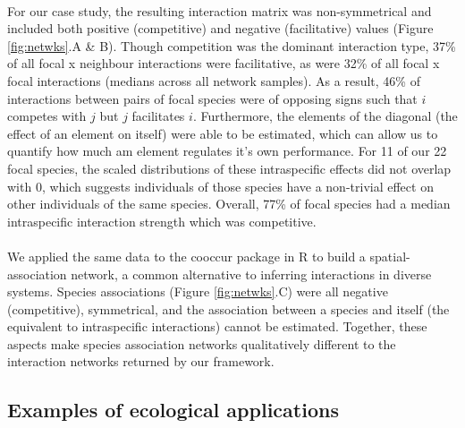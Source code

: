 \documentclass[a4,12pt]{article}
\begin{document}
  


    \paragraph{}
     For our case study, the resulting interaction matrix was non-symmetrical and included both positive (competitive) and negative (facilitative) values (Figure \ref{fig:netwks}.A \& B). Though competition was the dominant interaction type,  37\% of all focal x neighbour interactions were facilitative, as were 32\% of all focal x focal interactions (medians across all network samples). As a result, 46\% of interactions between pairs of focal species were of opposing signs such that $i$ competes with $j$ but $j$ facilitates $i$. Furthermore, the elements of the diagonal (the effect of an element on itself) were able to be estimated, which can allow us to quantify how much am element regulates it's own performance. For 11 of our 22 focal species, the scaled distributions of these intraspecific effects did not overlap with 0, which suggests individuals of those species have a non-trivial effect on other individuals of the same species. Overall, 77\% of focal species had a median intraspecific interaction strength which was competitive. 


     \paragraph{}
     We applied the same data to the cooccur package in R \parencite{Griffith2016} to build a spatial-association network, a common alternative to inferring interactions in diverse systems. Species associations (Figure \ref{fig:netwks}.C) were all negative (competitive), symmetrical, and the association between a species and itself (the equivalent to intraspecific interactions) cannot be estimated. Together, these aspects make species association networks qualitatively different to the interaction networks returned by our framework. 




    \subsection{Examples of ecological applications}
\end{document}
